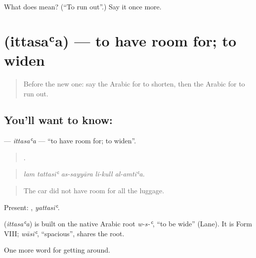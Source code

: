 \begin{tcolorbox}[breakable,colback=teal!4,colframe=teal!35!black,title={Before you move on}]
What does  mean? (\textquotedblleft{}To run out\textquotedblright{}.) Say it once more.
\end{tcolorbox}
\section[\texorpdfstring{\ar{اتسع} (ittasaʿa)}{اتسع (ittasaʿa)}]{ (ittasaʿa) — to have room for; to widen}

\label{lesson:AR-C462-ittasaa}



\begin{quote}
Before the new one: say the Arabic for to shorten, then the Arabic for to run out.
\end{quote}

\subsection*{You'll want to know: }
\textbf{} — \emph{ittasaʿa} — \textquotedblleft{}to have room for; to widen\textquotedblright{}.

\begin{quote}
    .
\end{quote}

\begin{quote}
\emph{lam tattasiʿ as-sayyāra li-kull al-amtiʿa.}
\end{quote}

\begin{quote}
The car did not have room for all the luggage.
\end{quote}

Present: , \emph{yattasiʿ}.

\begin{cousinweb}
\textbf{} (\emph{ittasaʿa}) is built on the native Arabic root \emph{w-s-ʿ}, \textquotedblleft{}to be wide\textquotedblright{} (Lane). It is Form VIII; \emph{wāsiʿ}, \textquotedblleft{}spacious\textquotedblright{}, shares the root.
\end{cousinweb}

\begin{grammarlens}[title={What you've built}]
One more word for getting around.
\end{grammarlens}

